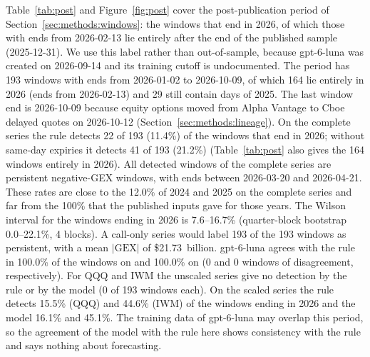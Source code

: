 Table~\ref{tab:post} and Figure~\ref{fig:post} cover the post-publication period of Section~\ref{sec:methods:windows}: the windows that end in 2026, of which those with ends from 2026-02-13 lie entirely after the end of the published sample (2025-12-31). We use this label rather than out-of-sample, because gpt-6-luna was created on 2026-09-14 and its training cutoff is undocumented.
The period has 193 windows with ends from 2026-01-02 to 2026-10-09, of which 164 lie entirely in 2026 (ends from 2026-02-13) and 29 still contain days of 2025. The last window end is 2026-10-09 because equity options moved from Alpha Vantage to Cboe delayed quotes on 2026-10-12 (Section~\ref{sec:methods:lineage}). On the complete series the rule detects 22 of 193 (11.4\%) of the windows that end in 2026; without same-day expiries it detects 41 of 193 (21.2\%) (Table~\ref{tab:post} also gives the 164 windows entirely in 2026). All detected windows of the complete series are persistent negative-GEX windows, with ends between 2026-03-20 and 2026-04-21. These rates are close to the 12.0\% of 2024 and 2025 on the complete series and far from the 100\% that the published inputs gave for those years. The Wilson interval for the windows ending in 2026 is 7.6--16.7\% (quarter-block bootstrap 0.0--22.1\%, 4 blocks). A call-only series would label 193 of the 193 windows as persistent, with a mean $|\mathrm{GEX}|$ of \$21.73~billion. gpt-6-luna agrees with the rule in 100.0\% of the windows on  and 100.0\% on  (0 and 0 windows of disagreement, respectively). For QQQ and IWM the unscaled series give no detection by the rule or by the model (0 of 193 windows each). On the scaled series the rule detects 15.5\% (QQQ) and 44.6\% (IWM) of the windows ending in 2026 and the model 16.1\% and 45.1\%. The training data of gpt-6-luna may overlap this period, so the agreement of the model with the rule here shows consistency with the rule and says nothing about forecasting.

